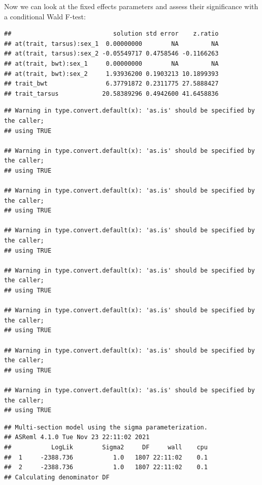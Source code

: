 \documentclass[
  12pt,
]{book}
\newenvironment{Shaded}{\begin{snugshade}}{\end{snugshade}}
\newcommand{\DataTypeTok}[1]{\textcolor[rgb]{0.13,0.29,0.53}{#1}}
\newcommand{\KeywordTok}[1]{\textcolor[rgb]{0.13,0.29,0.53}{\textbf{#1}}}
\newcommand{\NormalTok}[1]{#1}
\newcommand{\OperatorTok}[1]{\textcolor[rgb]{0.81,0.36,0.00}{\textbf{#1}}}
\newcommand{\OtherTok}[1]{\textcolor[rgb]{0.56,0.35,0.01}{#1}}
\newcommand{\StringTok}[1]{\textcolor[rgb]{0.31,0.60,0.02}{#1}}
\begin{document}
Now we can look at the fixed effects parameters and assess their significance with a conditional Wald F-test:

\begin{Shaded}
\end{Shaded}

\begin{verbatim}
##                            solution std error    z.ratio
## at(trait, tarsus):sex_1  0.00000000        NA         NA
## at(trait, tarsus):sex_2 -0.05549717 0.4758546 -0.1166263
## at(trait, bwt):sex_1     0.00000000        NA         NA
## at(trait, bwt):sex_2     1.93936200 0.1903213 10.1899393
## trait_bwt                6.37791872 0.2311775 27.5888427
## trait_tarsus            20.58389296 0.4942600 41.6458836
\end{verbatim}

\begin{verbatim}
## Warning in type.convert.default(x): 'as.is' should be specified by the caller;
## using TRUE

## Warning in type.convert.default(x): 'as.is' should be specified by the caller;
## using TRUE

## Warning in type.convert.default(x): 'as.is' should be specified by the caller;
## using TRUE

## Warning in type.convert.default(x): 'as.is' should be specified by the caller;
## using TRUE

## Warning in type.convert.default(x): 'as.is' should be specified by the caller;
## using TRUE

## Warning in type.convert.default(x): 'as.is' should be specified by the caller;
## using TRUE

## Warning in type.convert.default(x): 'as.is' should be specified by the caller;
## using TRUE

## Warning in type.convert.default(x): 'as.is' should be specified by the caller;
## using TRUE
\end{verbatim}

\begin{verbatim}
## Multi-section model using the sigma parameterization.
## ASReml 4.1.0 Tue Nov 23 22:11:02 2021
##           LogLik        Sigma2     DF     wall    cpu
##  1     -2388.736           1.0   1807 22:11:02    0.1
##  2     -2388.736           1.0   1807 22:11:02    0.1
## Calculating denominator DF
\end{verbatim}
\end{document}
